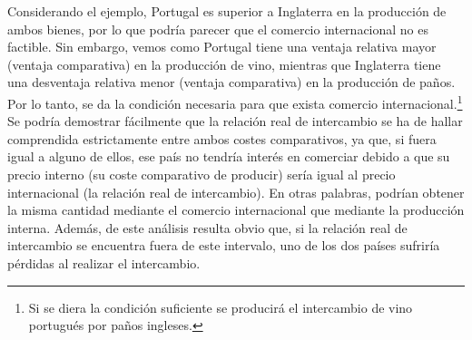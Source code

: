 \documentclass[10pt,a4paper]{article}
\begin{document}
Considerando el ejemplo, Portugal es superior a Inglaterra en la producción de ambos bienes, por lo que podría parecer que el comercio internacional no es factible. Sin embargo, vemos como Portugal tiene una ventaja relativa mayor (ventaja comparativa) en la producción de vino, mientras que Inglaterra tiene una desventaja relativa menor (ventaja comparativa) en la producción de paños. Por lo tanto, se da la condición necesaria para que exista comercio internacional.\footnote{%
    Si se diera la condición suficiente se producirá el intercambio de vino portugués por paños ingleses.
} Se podría demostrar fácilmente que la relación real de intercambio se ha de hallar comprendida estrictamente entre ambos costes comparativos, ya que, si fuera igual a alguno de ellos, ese país no tendría interés en comerciar debido a que su precio interno (su coste comparativo de producir) sería igual al precio internacional (la relación real de intercambio). En otras palabras, podrían obtener la misma cantidad mediante el comercio internacional que mediante la producción interna. Además, de este análisis resulta obvio que, si la relación real de intercambio se encuentra fuera de este intervalo, uno de los dos países sufriría pérdidas al realizar el intercambio.
\end{document}
